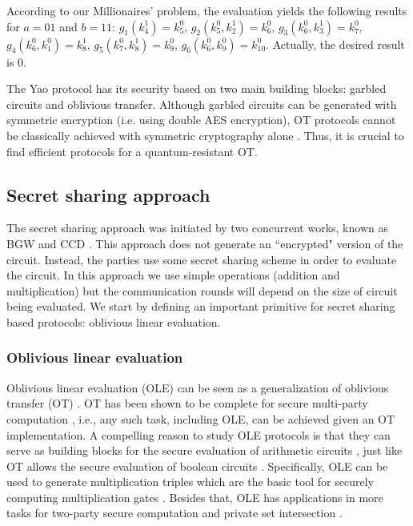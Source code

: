 \begin{enumerate}
    According to our Millionaires' problem, the evaluation yields the following results for $a = 01$ and $b = 11$: $g_1(k_4^1) = k_5^0$, $g_2(k_5^0, k_2^1) = k_6^0$, $g_3(k_6^0, k_3^1) = k_7^0$, $g_4(k_6^0, k_1^0) = k_8^1$, $g_5(k_7^0, k_8^1) = k_9^0$, $g_6(k_6^0, k_9^0) = k_{10}^0$. Actually, the desired result is $0$.
    
\end{enumerate}


The Yao protocol has its security based on two main building blocks: garbled circuits and oblivious transfer. Although garbled circuits can be generated with symmetric encryption (i.e. using double AES encryption), OT protocols cannot be classically achieved with symmetric cryptography alone \citep{IR89}. Thus, it is crucial to find efficient protocols for a quantum-resistant OT.



%
%
%

\subsection{Secret sharing approach}

The secret sharing approach was initiated by two concurrent works, known as BGW \cite{BGW88} and CCD \cite{CCD88}. This approach does not generate an ``encrypted" version of the circuit. Instead, the parties use some secret sharing scheme in order to evaluate the circuit. In this approach we use simple operations (addition and multiplication) but the communication rounds will depend on the size of circuit being evaluated. We start by defining an important primitive for secret sharing based protocols: oblivious linear evaluation.

\subsubsection{Oblivious linear evaluation}

Oblivious linear evaluation (OLE) can be seen as a generalization of oblivious transfer (OT) \cite{Rabin81}. OT has been shown to be complete for secure multi-party computation \cite{K88}, i.e., any such task, including OLE, can be achieved given an OT implementation. A compelling reason to study OLE protocols is that they can serve as building blocks for the secure evaluation of arithmetic circuits \cite{AIK11,DKMQ12,GNN17,DGNBNT17}, just like OT allows the secure evaluation of boolean circuits \cite{GMW87}. Specifically, OLE can be used to generate multiplication triples which are the basic tool for securely computing multiplication gates \cite{DGNBNT17}. Besides that, OLE has applications in more tasks for two-party secure computation  \cite{IPS09,ADINZ17,BCGI18,HIMV19,CDIKLOV19} and private set intersection \cite{GN19}.


